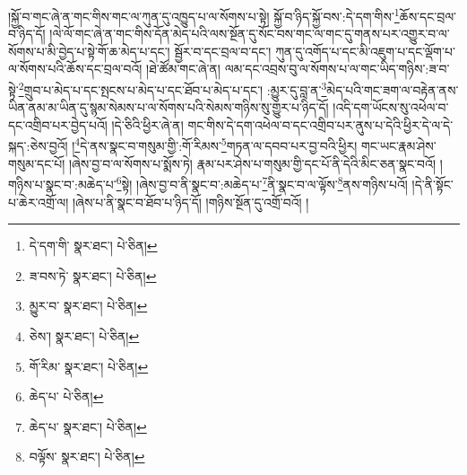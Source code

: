 །སྐྱོ་བ་གང་ཞེ་ན་གང་གིས་གང་ལ་ཀུན་དུ་འཁྱུད་པ་ལ་སོགས་པ་སྟེ། སྐྱོ་བ་ཉིད་སྐྱོ་བས་:དེ་དག་གིས་\footnote{དེ་དག་གི་  སྣར་ཐང་།  པེ་ཅིན། }ཆོས་དང་བྲལ་བ་ཉིད་དོ། །ལེ་ལོ་གང་ཞེ་ན་གང་གིས་དོན་མེད་པའི་ལས་སྔོན་དུ་སོང་བས་གང་ལ་གང་དུ་གནས་པར་འགྱུར་བ་ལ་སོགས་པ་མི་བྱེད་པ་སྟེ་གོ་ཆ་མེད་པ་དང་། སྦྱོར་བ་དང་བྲལ་བ་དང་། ཀུན་དུ་འགོད་པ་དང་མི་འཇུག་པ་དང་ལྡོག་པ་ལ་སོགས་པའི་ཆོས་དང་བྲལ་བའོ། །ཐེ་ཚོམ་གང་ཞེ་ན། ལམ་དང་འབྲས་བུ་ལ་སོགས་པ་ལ་གང་ཡིད་གཉིས་:ཟ་བ་སྟེ་\footnote{ཟ་བས་ཏེ་  སྣར་ཐང་།  པེ་ཅིན། }གྲུབ་པ་མེད་པ་དང་སྤངས་པ་མེད་པ་དང་ཐོབ་པ་མེད་པ་དང་། :མྱུར་དུ་བླ་ན་\footnote{མྱུར་བ་  སྣར་ཐང་།  པེ་ཅིན། }མེད་པའི་གང་ཟག་ལ་བརྟེན་ནས་ཡིན་ནམ་མ་ཡིན་དུ་སྙམ་སེམས་པ་ལ་སོགས་པའི་སེམས་གཉིས་སུ་གྱུར་པ་ཉིད་དོ། །འདི་དག་ཡོངས་སུ་འཕེལ་བ་དང་འགྲིབ་པར་བྱེད་པའོ། །དེ་ཅིའི་ཕྱིར་ཞེ་ན། གང་གིས་དེ་དག་འཕེལ་བ་དང་འགྲིབ་པར་ནུས་པ་དེའི་ཕྱིར་དེ་ལ་དེ་སྐད་:ཅེས་བྱའོ། །\footnote{ཅེས་།  སྣར་ཐང་།  པེ་ཅིན། }དེ་ནས་སྣང་བ་གསུམ་གྱི་:གོ་རིམས་\footnote{གོ་རིམ་  སྣར་ཐང་།  པེ་ཅིན། }གཏན་ལ་དབབ་པར་བྱ་བའི་ཕྱིར། གང་ཡང་རྣམ་ཤེས་གསུམ་དང་པོ། །ཞེས་བྱ་བ་ལ་སོགས་པ་སྨོས་ཏེ། རྣམ་པར་ཤེས་པ་གསུམ་གྱི་དང་པོ་ནི་དེའི་མིང་ཅན་སྣང་བའོ། །གཉིས་པ་སྣང་བ་:མཆེད་པ་\footnote{ཆེད་པ་  པེ་ཅིན། }སྟེ། །ཞེས་བྱ་བ་ནི་སྣང་བ་:མཆེད་པ་\footnote{ཆེད་པ་  སྣར་ཐང་།  པེ་ཅིན། }ནི་སྣང་བ་ལ་ལྟོས་\footnote{བལྟོས་  སྣར་ཐང་།  པེ་ཅིན། }ནས་གཉིས་པའོ། །དེ་ནི་སྟོང་པ་ཆེར་འགྲོ་ལ། །ཞེས་པ་ནི་སྣང་བ་ཐོབ་པ་ཉིད་དོ། །གཉིས་སྔོན་དུ་འགྲོ་བའོ། །
